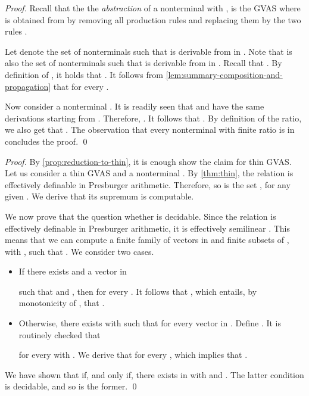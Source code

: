 \factabstraction*
\begin{proof}
Recall that the the \emph{abstraction} of a nonterminal  with
, is the GVAS  where
 is obtained from  by removing all production rules  and
replacing them by the two rules .
  
\smallskip

  Let  denote the set of nonterminals  such that
   is derivable from  in .
  Note that  is also the set of nonterminals  such that
   is derivable from  in .
  Recall that .
  By definition of , it holds that .
  It follows from \cref{lem:summary-composition-and-propagation} that
   for every .

  \smallskip

  Now consider a nonterminal .
  It is readily seen that  and  have the same derivations
   starting from .
  Therefore, .
  It follows that .
  By definition of the ratio,
  we also get that .
  The observation that every nonterminal with finite ratio is
  in  concludes the proof.
  \qed
\end{proof}


 
\summarycomputableboundedratio*
\begin{proof}
  By \cref{prop:reduction-to-thin}, it is enough show the claim for thin GVAS.
  Let us consider a thin GVAS  and a nonterminal .
  By \cref{thm:thin},
  the relation  is effectively definable in Presburger arithmetic.
  Therefore, so is the set
  ,
  for any given .
  We derive that its supremum 
  is computable.

  \smallskip

  We now prove that the question whether 
  is decidable.
  Since
  the relation  is effectively definable in
  Presburger arithmetic,
  it is effectively semilinear \cite{Ginsburg:1966:PACIF}.
  This means that we can compute a finite family
   of
  vectors  in  and
  finite subsets  of ,
  with ,
  such that
  .
  We consider two cases.
\begin{itemize}
  \item
    If there exists  and a vector  in
    
    such that  and ,
    then 
    for every .
    It follows that ,
    which entails, by monotonicity of ,
    that .
  \item
    Otherwise,
    there exists  with 
    such that  for every
    vector  in .
    Define .
    It is routinely checked that
    
    for every  with .
    We derive that 
    for every ,
    which implies that .
  \end{itemize}
We have shown that  if, and only if,
  there exists  in 
  with  and .
  The latter condition is decidable,
  and so is the former.
  \qed
\end{proof}

